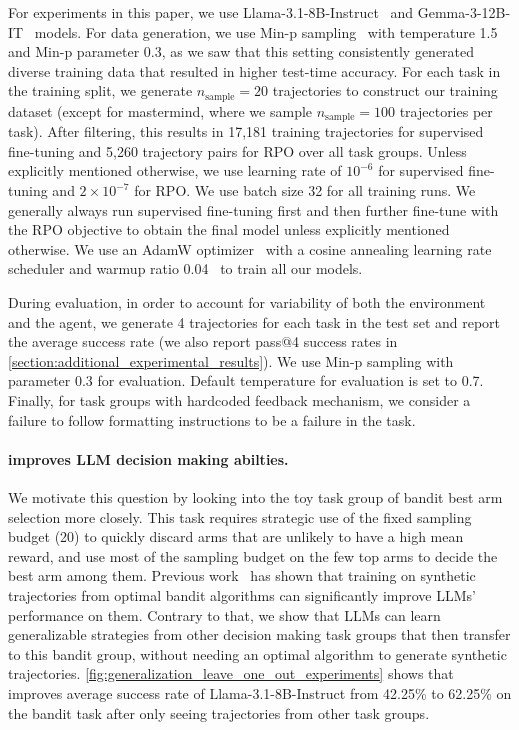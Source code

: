 For experiments in this paper, we use Llama-3.1-8B-Instruct~\citep{grattafiori2024llama3herdmodels} and Gemma-3-12B-IT~\citep{gemmateam2025gemma3technicalreport} models. For data generation, we use Min-p sampling~\citep{nguyen2024turning} with temperature 1.5 and Min-p parameter 0.3, as we saw that this setting consistently generated diverse training data that resulted in higher test-time accuracy. For each task in the training split, we generate $n_\text{sample} = 20$ trajectories to construct our training dataset (except for mastermind, where we sample $n_{\text{sample}} = 100$ trajectories per task). After filtering, this results in 17,181 training trajectories for supervised fine-tuning and 5,260 trajectory pairs for RPO over all task groups. Unless explicitly mentioned otherwise, we use learning rate of $10^{-6}$ for supervised fine-tuning and $2 \times 10^{-7}$ for RPO. We use batch size 32 for all training runs. We generally always run supervised fine-tuning first and then further fine-tune with the RPO objective to obtain the final model unless explicitly mentioned otherwise. We use an AdamW optimizer~\citep{loshchilov2019decoupledweightdecayregularization} with a cosine annealing learning rate scheduler and warmup ratio 0.04~\citep{loshchilov2017sgdrstochasticgradientdescent} to train all our models.

During evaluation, in order to account for variability of both the environment and the agent, we generate 4 trajectories for each task in the test set and report the average success rate (we also report pass@4 success rates in \cref{section:additional_experimental_results}). We use Min-p sampling with parameter 0.3 for evaluation. Default temperature for evaluation is set to 0.7. Finally, for task groups with hardcoded feedback mechanism, we consider a failure to follow formatting instructions to be a failure in the task.


\paragraph{\ours{} improves LLM decision making abilties.}

We motivate this question by looking into the toy task group of bandit best arm selection more closely. This task requires strategic use of the fixed sampling budget (20) to quickly discard arms that are unlikely to have a high mean reward, and use most of the sampling budget on the few top arms to decide the best arm among them. Previous work~\citep{nie2024evolveevaluatingoptimizingllms} has shown that training on synthetic trajectories from optimal bandit algorithms can significantly improve LLMs' performance on them. Contrary to that, we show that LLMs can learn generalizable strategies from other decision making task groups that then transfer to this bandit group, without needing an optimal algorithm to generate synthetic trajectories. \cref{fig:generalization_leave_one_out_experiments} shows that \ours{} improves average success rate of Llama-3.1-8B-Instruct from 42.25\% to 62.25\% on the bandit task after only seeing trajectories from other task groups.

